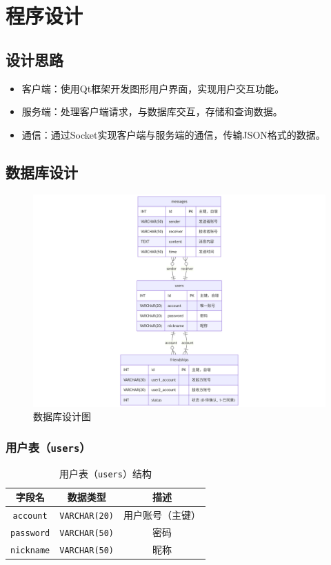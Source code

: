 \documentclass[UTF8]{ctexart}
\begin{document}
\section{程序设计}
\subsection{设计思路}
\begin{itemize}
	\item 客户端：使用Qt框架开发图形用户界面，实现用户交互功能。
	\item 服务端：处理客户端请求，与数据库交互，存储和查询数据。
	\item 通信：通过Socket实现客户端与服务端的通信，传输JSON格式的数据。
\end{itemize}
\subsection{数据库设计}
\begin{figure}[h]
	\centering
	\includegraphics[width=1\textwidth]{sql}
	\caption{数据库设计图}
\end{figure}
\subsubsection{用户表（\texttt{users}）}
\begin{table}[h]
	\centering
	\begin{tabular}{|c|c|c|}
		\hline
		字段名 & 数据类型 & 描述 \\
		\hline
		\texttt{account} & \texttt{VARCHAR(20)} & 用户账号（主键） \\
		\texttt{password} & \texttt{VARCHAR(50)} & 密码 \\
		\texttt{nickname} & \texttt{VARCHAR(50)} & 昵称 \\
		\hline
	\end{tabular}
	\caption{用户表（\texttt{users}）结构}
	\label{tab:users}
\end{table}
\end{document}
